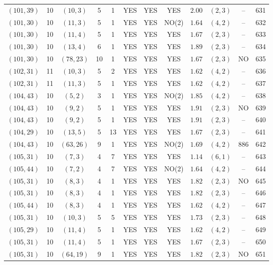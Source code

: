 \begin{longtable}{|c|c|c|c|c|c|c|c|c|c|c|c|}
$(101,39)$ & 10 & $(10,3)$ & 5 & 1 & YES & YES & YES & $2.00$ & $(2,3)$ & -- & 631\\
$(101,30)$ & 10 & $(11,3)$ & 5 & 1 & YES & YES & NO(2) & $1.64$ & $(4,2)$ & -- & 632\\
$(101,30)$ & 10 & $(11,4)$ & 5 & 1 & YES & YES & YES & $1.67$ & $(2,3)$ & -- & 633\\
$(101,30)$ & 10 & $(13,4)$ & 6 & 1 & YES & YES & YES & $1.89$ & $(2,3)$ & -- & 634\\
$(101,30)$ & 10 & $(78,23)$ & 10 & 1 & YES & YES & YES & $1.67$ & $(2,3)$ & NO & 635\\
$(102,31)$ & 11 & $(10,3)$ & 5 & 2 & YES & YES & YES & $1.62$ & $(4,2)$ & -- & 636\\
$(102,31)$ & 11 & $(11,3)$ & 5 & 1 & YES & YES & YES & $1.62$ & $(4,2)$ & -- & 637\\
$(104,43)$ & 10 & $(5,2)$ & 3 & 1 & YES & YES & NO(2) & $1.85$ & $(4,2)$ & -- & 638\\
$(104,43)$ & 10 & $(9,2)$ & 5 & 1 & YES & YES & YES & $1.91$ & $(2,3)$ & NO & 639\\
$(104,43)$ & 10 & $(9,2)$ & 5 & 1 & YES & YES & YES & $1.91$ & $(2,3)$ & -- & 640\\
$(104,29)$ & 10 & $(13,5)$ & 5 & 13 & YES & YES & YES & $1.67$ & $(2,3)$ & -- & 641\\
$(104,43)$ & 10 & $(63,26)$ & 9 & 1 & YES & YES & NO(2) & $1.69$ & $(4,2)$ & 886 & 642\\
$(105,31)$ & 10 & $(7,3)$ & 4 & 7 & YES & YES & YES & $1.14$ & $(6,1)$ & -- & 643\\
$(105,44)$ & 10 & $(7,2)$ & 4 & 7 & YES & YES & NO(2) & $1.64$ & $(4,2)$ & -- & 644\\
$(105,31)$ & 10 & $(8,3)$ & 4 & 1 & YES & YES & YES & $1.82$ & $(2,3)$ & NO & 645\\
$(105,31)$ & 10 & $(8,3)$ & 4 & 1 & YES & YES & YES & $1.82$ & $(2,3)$ & -- & 646\\
$(105,44)$ & 10 & $(8,3)$ & 4 & 1 & YES & YES & YES & $1.62$ & $(4,2)$ & -- & 647\\
$(105,31)$ & 10 & $(10,3)$ & 5 & 5 & YES & YES & YES & $1.73$ & $(2,3)$ & -- & 648\\
$(105,29)$ & 10 & $(11,4)$ & 5 & 1 & YES & YES & YES & $1.62$ & $(4,2)$ & -- & 649\\
$(105,31)$ & 10 & $(11,4)$ & 5 & 1 & YES & YES & YES & $1.67$ & $(2,3)$ & -- & 650\\
$(105,31)$ & 10 & $(64,19)$ & 9 & 1 & YES & YES & YES & $1.82$ & $(2,3)$ & NO & 651\\

\end{longtable}
